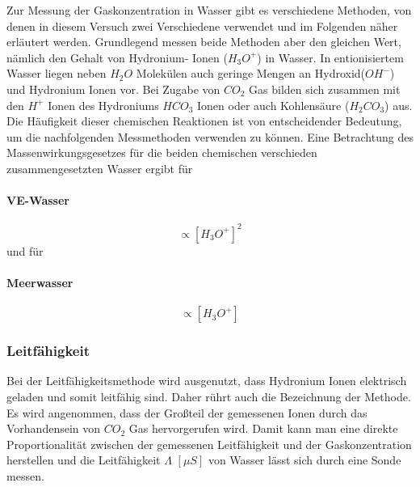 \documentclass[12pt]{article}
\begin{document}
Zur Messung der Gaskonzentration in Wasser gibt es verschiedene Methoden, von denen in diesem Versuch zwei Verschiedene verwendet und im Folgenden näher erläutert werden.
Grundlegend messen beide Methoden aber den gleichen Wert, nämlich den Gehalt von Hydronium- Ionen ($H_3O^+$) in Wasser. 
In entionisiertem Wasser liegen neben $H_2O$ Molekülen auch geringe Mengen an Hydroxid($OH^-$) und Hydronium Ionen vor. Bei Zugabe von $CO_2$ Gas bilden sich zusammen mit den $H^+$ Ionen des Hydroniums $HCO_3$ Ionen oder auch Kohlensäure ($H_2CO_3$) aus. Die Häufigkeit dieser chemischen Reaktionen ist von entscheidender Bedeutung, um die nachfolgenden Messmethoden verwenden zu können. Eine Betrachtung des Massenwirkungsgesetzes für die beiden chemischen verschieden zusammengesetzten Wasser ergibt für 
\paragraph*{VE-Wasser}
\begin{equation}
	[CO_2] \propto [H_3O^+]^2
\end{equation}
und für 
\paragraph*{Meerwasser}
\begin{equation}
	[CO_2] \propto [H_3O^+]
\end{equation}

\subsubsection{Leitfähigkeit}
Bei der Leitfähigkeitsmethode wird ausgenutzt, dass Hydronium Ionen elektrisch geladen und somit leitfähig sind. Daher rührt auch die Bezeichnung der Methode. 
Es wird angenommen, dass der Großteil der gemessenen Ionen durch das Vorhandensein von $CO_2$ Gas hervorgerufen wird. 
Damit kann man eine direkte Proportionalität zwischen der gemessenen Leitfähigkeit und der Gaskonzentration herstellen und die Leitfähigkeit $\Lambda$ $[\mu S]$ von Wasser lässt sich durch eine Sonde messen. 
\end{document}
